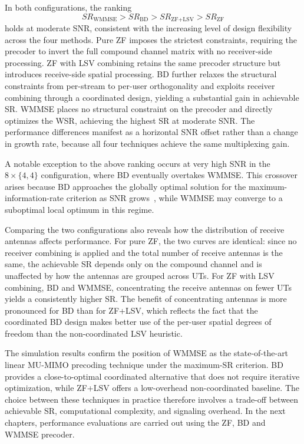In both configurations, the ranking
$$
SR_{\text{WMMSE}} > SR_{\text{BD}} > SR_{\text{ZF}+\text{LSV}} > SR_{\text{ZF}} 
$$
holds at moderate \ac{SNR}, consistent with the increasing level of design flexibility across the four methods.
Pure \ac{ZF} imposes the strictest constraints, requiring the precoder to invert the full compound channel matrix with no receiver-side processing.
\ac{ZF} with \ac{LSV} combining retains the same precoder structure but introduces receive-side spatial processing.
\ac{BD} further relaxes the structural constraints from per-stream to per-user orthogonality and exploits receiver combining through a coordinated design, yielding a substantial gain in achievable \ac{SR}.
\ac{WMMSE} places no structural constraint on the precoder and directly optimizes the \ac{WSR}, achieving the highest \ac{SR} at moderate \ac{SNR}.
The performance differences manifest as a horizontal \ac{SNR} offset rather than a change in growth rate, because all four techniques achieve the same multiplexing gain.

A notable exception to the above ranking occurs at very high \ac{SNR} in the $8 \times \{4,4\}$ configuration, where \ac{BD} eventually overtakes \ac{WMMSE}.
This crossover arises because \ac{BD} approaches the globally optimal solution for the maximum-information-rate criterion as \ac{SNR} grows~\cite{BD_precoding_0}, while \ac{WMMSE} may converge to a suboptimal local optimum in this regime.

Comparing the two configurations also reveals how the distribution of receive antennas affects performance.
For pure \ac{ZF}, the two curves are identical: since no receiver combining is applied and the total number of receive antennas is the same, the achievable \ac{SR} depends only on the compound channel and is unaffected by how the antennas are grouped across \acp{UT}.
For \ac{ZF} with \ac{LSV} combining, \ac{BD} and \ac{WMMSE}, concentrating the receive antennas on fewer \acp{UT} yields a consistently higher \ac{SR}.
The benefit of concentrating antennas is more pronounced for \ac{BD} than for \ac{ZF}+\ac{LSV}, which reflects the fact that the coordinated \ac{BD} design makes better use of the per-user spatial degrees of freedom than the non-coordinated \ac{LSV} heuristic.

The simulation results confirm the position of \ac{WMMSE} as the state-of-the-art linear \ac{MU}-\ac{MIMO} precoding technique under the maximum-\ac{SR} criterion.
\ac{BD} provides a close-to-optimal coordinated alternative that does not require iterative optimization, while \ac{ZF}+\ac{LSV} offers a low-overhead non-coordinated baseline.
The choice between these techniques in practice therefore involves a trade-off between achievable \ac{SR}, computational complexity, and signaling overhead.
In the next chapters, performance evaluations are carried out using the \ac{ZF}, \ac{BD} and \ac{WMMSE} precoder.
